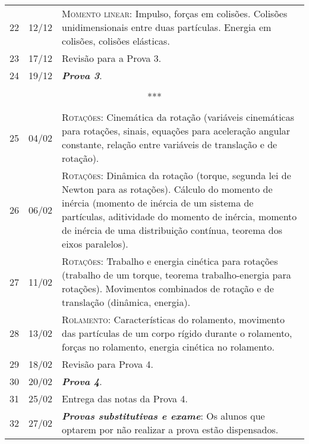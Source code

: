 \begin{center}
\begin{longtable}{ccp{70mm}}
22	 & 	12/12	 & 	\textsc{Momento linear:} Impulso, forças em colisões. Colisões unidimensionais entre duas partículas. Energia em colisões, colisões elásticas. \\
23	 & 	17/12	 & 	Revisão para a Prova 3. \\
24	 & 	19/12	 & 	\textbf{\textit{Prova 3}}. \\
\\
\multicolumn{3}{c}{***} \\
\\
25	 & 	04/02	 & 	\textsc{Rotações:} Cinemática da rotação (variáveis cinemáticas para rotações, sinais, equações para aceleração angular constante, relação entre variáveis de translação e de rotação). \\
26	 & 	06/02	 & 	\textsc{Rotações:} Dinâmica da rotação (torque, segunda lei de Newton para as rotações). Cálculo do momento de inércia (momento de inércia de um sistema de partículas, aditividade do momento de inércia, momento de inércia de uma distribuição contínua, teorema dos eixos paralelos). \\
27	 & 	11/02	 & 	\textsc{Rotações:} Trabalho e energia cinética para rotações (trabalho de um torque, teorema trabalho-energia para rotações). Movimentos combinados de rotação e de translação (dinâmica, energia). \\
28	 &  13/02	 & 	\textsc{Rolamento:} Características do rolamento, movimento das partículas de um corpo rígido durante o rolamento, forças no rolamento, energia cinética no rolamento. \\
29	 & 	18/02	 & 	Revisão para Prova 4. \\
30	 & 	20/02	 & 	\textbf{\textit{Prova 4}}. \\
31	 & 	25/02	 & 	Entrega das notas da Prova 4. \\
32	 & 	27/02	 & 	\textbf{\textit{Provas substitutivas e exame}}: Os alunos que optarem por não realizar a prova estão dispensados.
\end{longtable}
\end{center}


\cleardoublepage

